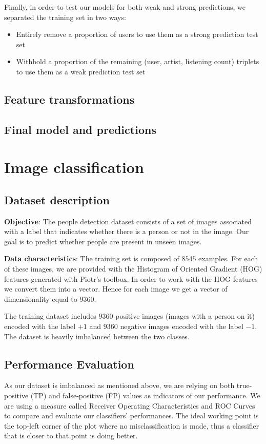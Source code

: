 \documentclass{article}
\begin{document}
  Finally, in order to test our models for both weak and strong predictions, we separated the training set in two ways:
  \begin{itemize}
    \item Entirely remove a proportion of users to use them as a strong prediction test set
    \item Withhold a proportion of the remaining (user, artist, listening count) triplets to use them as a weak prediction test set
  \end{itemize}

  \subsection{Feature transformations}

  \subsection{Final model and predictions}



\section{Image classification}

  \subsection{Dataset description}
  \textbf{Objective}: The people detection dataset consists of a set of images associated with a label that indicates whether there is a person or not in the image. Our goal is to predict whether people are present in unseen images.

  \textbf{Data characteristics}: The training set is composed of $8545$ examples. For each of these images, we are provided with the Histogram of Oriented Gradient (HOG) features generated with Piotr's toolbox. In order to work with the HOG features we convert them into a vector. Hence for each image we get a vector of dimensionality equal to $9360$. 
  
  The training dataset includes $9360$ positive images (images with a person on it) encoded with the label $+1$ and $9360$ negative images encoded with the label $-1$. The dataset is heavily imbalanced between the two classes. 
  
  \subsection{Performance Evaluation}
  As our dataset is imbalanced as mentioned above, we are relying on both true-positive (TP) and false-positive (FP) values as indicators of our performance. We are using a measure called Receiver Operating Characteristics and ROC Curves to compare and evaluate our classifiers' performances. The ideal working point is the top-left corner of the plot where no misclassification is made, thus a classifier that is closer to that point is doing better. 
  
\end{document}
